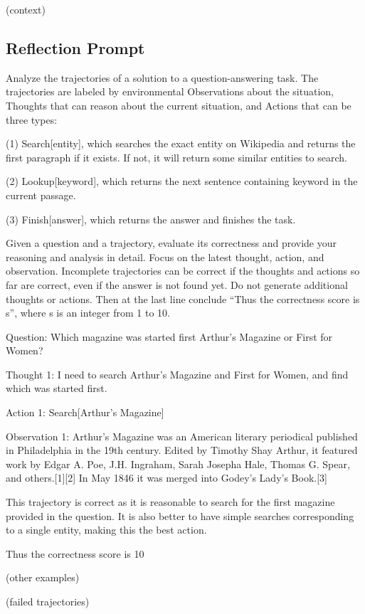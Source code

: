 {(context)

\subsection{Reflection Prompt}


Analyze the trajectories of a solution to a question-answering task. The trajectories are labeled by environmental Observations about the situation, Thoughts that can reason about the current situation, and Actions that can be three types: 

(1) Search[entity], which searches the exact entity on Wikipedia and returns the first paragraph if it exists. If not, it will return some similar entities to search.

(2) Lookup[keyword], which returns the next sentence containing keyword in the current passage.

(3) Finish[answer], which returns the answer and finishes the task.

Given a question and a trajectory, evaluate its correctness and provide your reasoning and analysis in detail. Focus on the latest thought, action, and observation. Incomplete trajectories can be correct if the thoughts and actions so far are correct, even if the answer is not found yet. Do not generate additional thoughts or actions. Then at the last line conclude ``Thus the correctness score is {s}'', where s is an integer from 1 to 10.

Question: Which magazine was started first Arthur's Magazine or First for Women?

Thought 1: I need to search Arthur's Magazine and First for Women, and find which was started first.

Action 1: Search[Arthur's Magazine]

Observation 1: Arthur's Magazine was an American literary periodical published in Philadelphia in the 19th century. Edited by Timothy Shay Arthur, it featured work by Edgar A. Poe, J.H. Ingraham, Sarah Josepha Hale, Thomas G. Spear, and others.[1][2] In May 1846 it was merged into Godey's Lady's Book.[3]

This trajectory is correct as it is reasonable to search for the first magazine provided in the question. It is also better to have simple searches corresponding to a single entity, making this the best action.

Thus the correctness score is 10

(other examples)

(failed trajectories)

}
